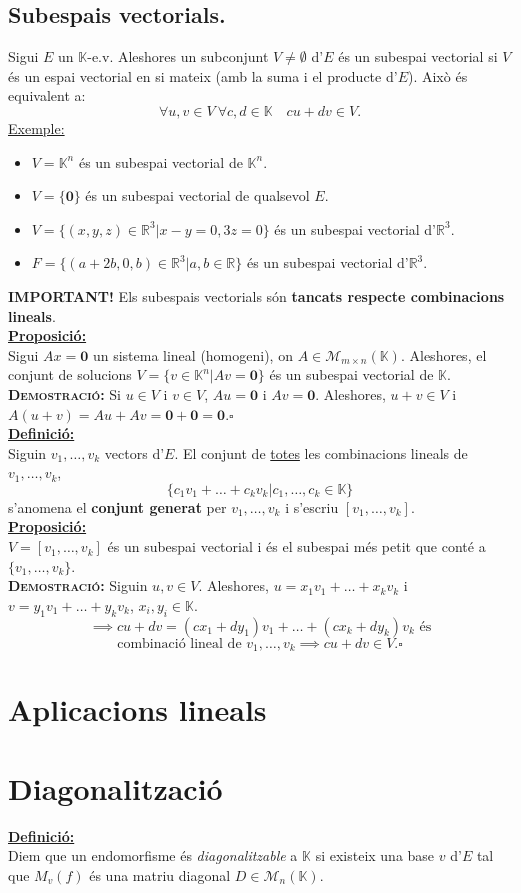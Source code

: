 \documentclass[11pt]{article}
\newcommand{\fieldk}{\mathbb{K}}
\newcommand{\definicio}{\underline{\textbf{Definició:}}\\}
\newcommand{\proposicio}{\underline{\textbf{Proposició:}}\\}
\newcommand{\demostracio}{\textbf{{\scshape Demostració: }}}
\newcommand{\ex}{\underline{Exemple:}}
\newcommand{\important}{\textbf{IMPORTANT! }}
\begin{document}
\subsection{Subespais vectorials.}
Sigui $E$ un $\fieldk$-e.v. Aleshores un subconjunt $V\neq\emptyset$ d'$E$ és un subespai vectorial si $V$ és un espai vectorial en si mateix (amb la suma i el producte d'$E$). Això és equivalent a:
$$\forall u,v\in V \ \forall c,d\in\fieldk \quad cu+dv\in V.$$
\ex \begin{itemize}
	\item $V=\fieldk^n$ és un subespai vectorial de $\fieldk^n$.
	\item $V=\{\textbf{0}\}$ és un subespai vectorial de qualsevol $E$.
	\item $V=\{(x,y,z)\in\mathbb{R}^3|x-y=0,3z=0\}$ és un subespai vectorial d'$\mathbb{R}^3$.
	\item $F=\{(a+2b,0,b)\in\mathbb{R}^3|a,b\in\mathbb{R}\}$ és un subespai vectorial d'$\mathbb{R}^3$.
\end{itemize}
\newpage
\noindent \important Els subespais vectorials són \textbf{tancats respecte combinacions lineals}.\\
\proposicio Sigui $Ax=\textbf{0}$ un sistema lineal (homogeni), on $A\in\mathcal{M}_{m\times n}(\fieldk)$. Aleshores, el conjunt de solucions $V=\{v\in\fieldk^n|Av=\textbf{0}\}$ és un subespai vectorial de $\fieldk$.\\
\demostracio Si $u\in V$ i $v\in V$, $Au=\textbf{0}$ i $Av=\textbf{0}$. Aleshores, $u+v\in V$ i $A(u+v)=Au+Av=\textbf{0}+\textbf{0}=\textbf{0}$.$\square$\\
\definicio Siguin $v_1,\ldots,v_k$ vectors d'$E$. El conjunt de \underline{totes} les combinacions lineals de $v_1,\ldots,v_k$,
$$\{c_1v_1+\ldots+c_kv_k|c_1,\ldots,c_k\in\fieldk\}$$
s'anomena el \textbf{conjunt generat} per $v_1,\ldots,v_k$ i s'escriu $[v_1,\ldots,v_k]$.\\
\proposicio $V=[v_1,\ldots,v_k]$ és un subespai vectorial i és el subespai més petit que conté a $\{v_1,\ldots,v_k\}$.\\
\demostracio Siguin $u,v\in V$. Aleshores, $u=x_1v_1+\ldots+x_kv_k$ i $v=y_1v_1+\ldots+y_kv_k$, $x_i,y_i\in\fieldk$.
$$\implies cu+dv=(cx_1+dy_1)v_1+\ldots+(cx_k+dy_k)v_k\textrm{ és}$$
$$\textrm{combinació lineal de }v_1,\ldots,v_k\implies cu+dv\in V.\square$$

\newpage
\section{Aplicacions lineals}

\newpage
\section{Diagonalització}
\definicio Diem que un endomorfisme és \textit{diagonalitzable} a $\fieldk$ si existeix una base $v$ d'$E$ tal que $M_v(f)$ és una matriu diagonal $D\in\mathcal{M}_n(\fieldk)$.
\newpage
\end{document}
